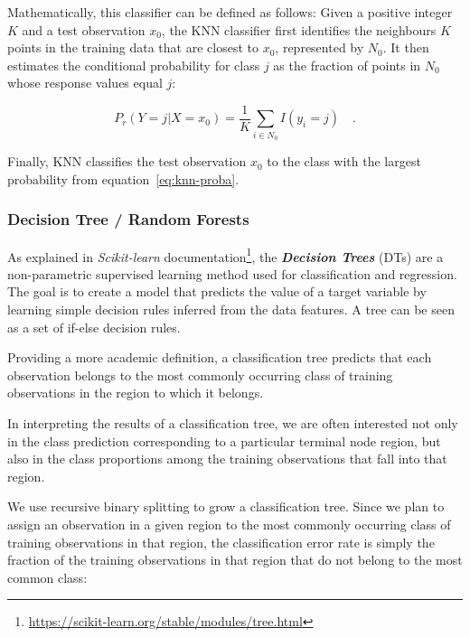 \documentclass[a4paper, 12pt]{book}
\begin{document}
Mathematically, this classifier can be defined as follows: Given a positive integer $K$ and a test observation $x_{0}$, the KNN classifier first identifies the neighbours $K$ points in the training data that are closest to $x_{0}$, represented by $N_{0}$. It then estimates the conditional probability for class $j$ as the fraction of points in $N_{0}$ whose response values equal $j$:

\begin{center}
\begin{equation} \label{eq:knn-proba}
P_{r}(Y = j | X = x_{0})= \frac{1}{K} \sum_{i \in N_{0}}^{} I(y_{i} = j)
 \quad.
\end{equation}
\end{center}

Finally, KNN classifies the test observation $x_{0}$ to the class with the largest probability from equation~\ref{eq:knn-proba}.

\subsubsection{Decision Tree / Random Forests}
\label{sssec:decision-trees}


As explained in \textit{Scikit-learn} documentation\footnote{\url{https://scikit-learn.org/stable/modules/tree.html}}, the \textbf{\textit{Decision Trees}} (DTs) are a non-parametric supervised learning method used for classification and regression. The goal is to create a model that predicts the value of a target variable by learning simple decision rules inferred from the data features. A tree can be seen as a set of if-else decision rules.

Providing a more academic definition, a classification tree predicts that each observation belongs to the most commonly 
occurring class of training observations in the region to which it belongs.

In interpreting the results of a classification tree, we are often interested not only in the class prediction
corresponding to a particular terminal node region, but also in the class proportions among the training
observations that fall into that region.

We use recursive binary splitting to grow a classification tree. Since we plan to assign an observation
in a given region to the most commonly occurring class of training observations in that region,
the classification error rate is simply the fraction of the training observations in that region that do not
belong to the most common class:
\end{document}
